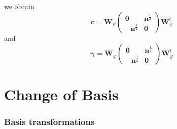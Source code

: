 \documentclass[aps,preprint]{revtex4}
\begin{document}
we obtain 
\begin{equation}
\mathbf{c}=\mathbf{W}_{\psi }\left( 
\begin{array}{cc}
\mathbf{0} & \mathbf{n}^{\frac{1}{2}} \\ 
\mathbf{-n}^{\frac{1}{2}} & \mathbf{0}%
\end{array}%
\right) \mathbf{W}_{\psi }^{t}
\end{equation}%
and 
\begin{equation}
\mathbf{\gamma }=\mathbf{W}_{\varphi }\left( 
\begin{array}{cc}
\mathbf{0} & \mathbf{n}^{\frac{1}{2}} \\ 
\mathbf{-n}^{\frac{1}{2}} & \mathbf{0}%
\end{array}%
\right) \mathbf{W}_{\varphi }^{t}
\end{equation}

\section{Change of Basis\label{Change}}

\subsubsection{Basis transformations}
\end{document}

